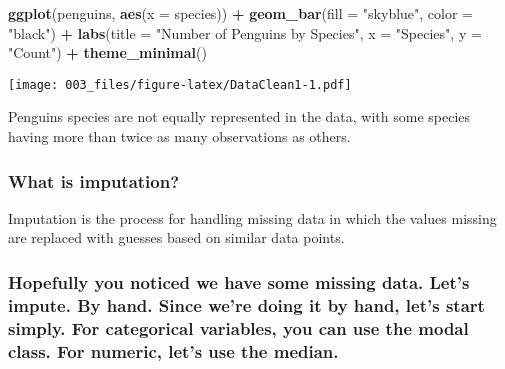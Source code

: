 \documentclass[
]{article}
\newenvironment{Shaded}{\begin{snugshade}}{\end{snugshade}}
\newcommand{\AttributeTok}[1]{\textcolor[rgb]{0.13,0.29,0.53}{#1}}
\newcommand{\FunctionTok}[1]{\textcolor[rgb]{0.13,0.29,0.53}{\textbf{#1}}}
\newcommand{\NormalTok}[1]{#1}
\newcommand{\SpecialCharTok}[1]{\textcolor[rgb]{0.81,0.36,0.00}{\textbf{#1}}}
\newcommand{\StringTok}[1]{\textcolor[rgb]{0.31,0.60,0.02}{#1}}
\begin{document}
\begin{Shaded}
\begin{Highlighting}[]
\FunctionTok{ggplot}\NormalTok{(penguins, }\FunctionTok{aes}\NormalTok{(}\AttributeTok{x =}\NormalTok{ species)) }\SpecialCharTok{+}
  \FunctionTok{geom\_bar}\NormalTok{(}\AttributeTok{fill =} \StringTok{"skyblue"}\NormalTok{, }\AttributeTok{color =} \StringTok{"black"}\NormalTok{) }\SpecialCharTok{+}
  \FunctionTok{labs}\NormalTok{(}\AttributeTok{title =} \StringTok{"Number of Penguins by Species"}\NormalTok{,}
       \AttributeTok{x =} \StringTok{"Species"}\NormalTok{,}
       \AttributeTok{y =} \StringTok{"Count"}\NormalTok{) }\SpecialCharTok{+}
  \FunctionTok{theme\_minimal}\NormalTok{()}
\end{Highlighting}
\end{Shaded}

\texttt{[image: 003\_files/figure-latex/DataClean1-1.pdf]}

Penguins species are not equally represented in the data, with some
species having more than twice as many observations as others.

\subsubsection{What is imputation?}\label{what-is-imputation}

Imputation is the process for handling missing data in which the values
missing are replaced with guesses based on similar data points.

\subsubsection{Hopefully you noticed we have some missing data. Let's
impute. By hand. Since we're doing it by hand, let's start simply. For
categorical variables, you can use the modal class. For numeric, let's
use the
median.}\label{hopefully-you-noticed-we-have-some-missing-data.-lets-impute.-by-hand.-since-were-doing-it-by-hand-lets-start-simply.-for-categorical-variables-you-can-use-the-modal-class.-for-numeric-lets-use-the-median.}
\end{document}
